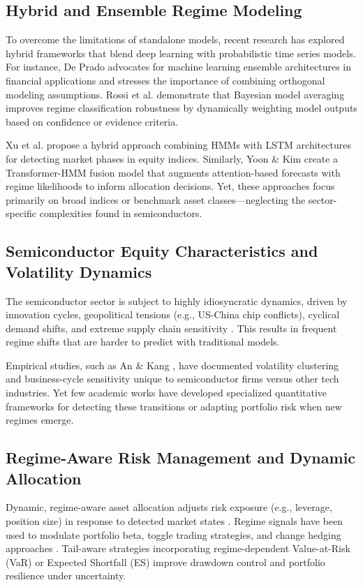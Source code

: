 \subsection{Hybrid and Ensemble Regime Modeling}
To overcome the limitations of standalone models, recent research has explored hybrid frameworks that blend deep learning with probabilistic time series models. For instance, De Prado \cite{deprado2018advances} advocates for machine learning ensemble architectures in financial applications and stresses the importance of combining orthogonal modeling assumptions. Rossi et al. \cite{rossi2020bayesian} demonstrate that Bayesian model averaging improves regime classification robustness by dynamically weighting model outputs based on confidence or evidence criteria.

Xu et al. \cite{xu2021hybrid} propose a hybrid approach combining HMMs with LSTM architectures for detecting market phases in equity indices. Similarly, Yoon \& Kim \cite{yoon2022transformerhmm} create a Transformer-HMM fusion model that augments attention-based forecasts with regime likelihoods to inform allocation decisions. Yet, these approaches focus primarily on broad indices or benchmark asset classes—neglecting the sector-specific complexities found in semiconductors.

\subsection{Semiconductor Equity Characteristics and Volatility Dynamics}
The semiconductor sector is subject to highly idiosyncratic dynamics, driven by innovation cycles, geopolitical tensions (e.g., US-China chip conflicts), cyclical demand shifts, and extreme supply chain sensitivity \cite{icinsights2023, bcg2021}. This results in frequent regime shifts that are harder to predict with traditional models.

Empirical studies, such as An \& Kang \cite{an2019volatility}, have documented volatility clustering and business-cycle sensitivity unique to semiconductor firms versus other tech industries. Yet few academic works have developed specialized quantitative frameworks for detecting these transitions or adapting portfolio risk when new regimes emerge.

\subsection{Regime-Aware Risk Management and Dynamic Allocation}
Dynamic, regime-aware asset allocation adjusts risk exposure (e.g., leverage, position size) in response to detected market states \cite{ilmanen2011expected, mcneil2015quantitative}. Regime signals have been used to modulate portfolio beta, toggle trading strategies, and change hedging approaches \cite{ang2012regime}. Tail-aware strategies incorporating regime-dependent Value-at-Risk (VaR) or Expected Shortfall (ES) improve drawdown control and portfolio resilience under uncertainty.

